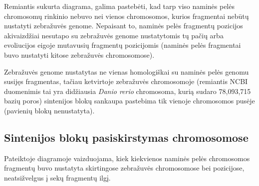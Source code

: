 \documentclass[12pt]{article}
\begin{document}
Remiantis sukurta diagrama, galima pastebėti, kad tarp viso naminės pelės
chromosomų rinkinio nebuvo nei vienos chromosomos, kurios fragmentai nebūtų
nustatyti zebražuvės genome. Nepaisant to, naminės pelės fragmentų
pozicijos akivaizdžiai nesutapo su zebražuvės genome nustatytomis tų pačių
arba evoliucijos eigoje mutavusių fragmentų pozicijomis (naminės pelės
fragmentai buvo nustatyti kitose zebražuvės chromosomose).

Zebražuvės genome nustatytas ne vienas homologiškai su naminės pelės genomu
susijęs fragmentas, tačiau ketvirtoje zebražuvės chromosomoje (remiantis
NCBI\cite{NCBI} duomenimis tai yra didžiausia \emph{Danio rerio} chromosoma,
kurią sudaro 78,093,715 bazių poros) sintenijos blokų sankaupa pastebima
tik vienoje chromosomos pusėje (pavienių blokų nenustatyta).

\subsection{Sintenijos blokų pasiskirstymas chromosomose}
Pateiktoje diagramoje vaizduojama, kiek kiekvienos naminės pelės chromosomos
fragmentų buvo nustatyta skirtingose zebražuvės chromosomose bei pozicijose,
neatsižvelgus į sekų fragmentų ilgį.
\end{document}
